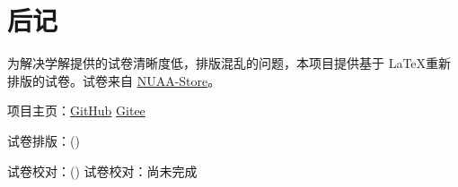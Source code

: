 \section{后记}

为解决学解提供的试卷清晰度低，排版混乱的问题，本项目提供基于 \LaTeX 重新排版的试卷。试卷来自 \href{https://nuaa.store/}{NUAA-Store}。

项目主页：\href{https://github.com/24bit-xjkp/NuaaExam}{GitHub} \quad \href{https://gitee.com/xjkp-24bit/NuaaExam}{Gitee}

\ifdefined\Auther
    试卷排版：\Auther (\AutherEmail)
\fi

\ifdefined\Proofread
    试卷校对：\Proofread (\ProofreadEmail)
\else
    试卷校对：尚未完成
\fi
